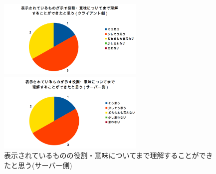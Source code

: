 \documentclass{funthesis}
\begin{document}
\begin{figure}[H]
 \begin{minipage}{0.5\hsize}
  \begin{center}
  \includegraphics[width=70mm]{./img/question3.png}
  \end{center}
  \caption{表示されているものの役割・意味\newline についてまで理解することができた\newline と思う(クライアント側)}
  \label{question3}
 \end{minipage}
 \begin{minipage}{0.5\hsize}
  \begin{center}
  \includegraphics[width=70mm]{./img/question4.png}
  \end{center}
  \caption{表示されているものの役割・意味\newline についてまで理解することができた\newline と思う(サーバー側)}
  \label{question4}
  \end{minipage}
  \end{figure}
  
\end{document}
